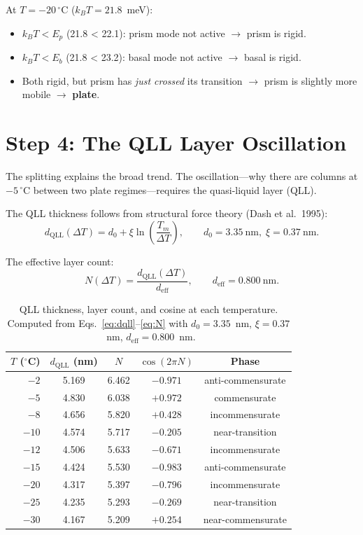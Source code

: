\documentclass[12pt,letterpaper]{article}
\begin{document}
At $T = -20\,{}^\circ$C ($k_BT = 21.8$~meV):
\begin{itemize}
\item $k_BT < E_p$ (21.8 < 22.1): prism mode not active $\to$ prism is rigid.
\item $k_BT < E_b$ (21.8 < 23.2): basal mode not active $\to$ basal is rigid.
\item Both rigid, but prism has \emph{just crossed} its transition $\to$ prism is slightly more mobile $\to$ \textbf{plate}. \checkmark
\end{itemize}

\section{Step 4: The QLL Layer Oscillation}
\label{sec:oscillation}

The splitting explains the broad trend.  The oscillation---why there are columns at $-5\,{}^\circ$C between two plate regimes---requires the quasi-liquid layer (QLL).

The QLL thickness follows from structural force theory (Dash et al.\ 1995):
\begin{equation}
d_{\mathrm{QLL}}(\Delta T) = d_0 + \xi \ln\!\left(\frac{T_m}{\Delta T}\right), \qquad d_0 = 3.35~\mathrm{nm},\; \xi = 0.37~\mathrm{nm}.
\label{eq:dqll}
\end{equation}

The effective layer count:
\begin{equation}
N(\Delta T) = \frac{d_{\mathrm{QLL}}(\Delta T)}{d_{\mathrm{eff}}}, \qquad d_{\mathrm{eff}} = 0.800~\mathrm{nm}.
\label{eq:N}
\end{equation}

\begin{table}[H]
\centering
\caption{QLL thickness, layer count, and cosine at each temperature.  Computed from Eqs.~\eqref{eq:dqll}--\eqref{eq:N} with $d_0 = 3.35$~nm, $\xi = 0.37$~nm, $d_{\mathrm{eff}} = 0.800$~nm.}
\label{tab:N}
\begin{tabular}{@{}rcccc@{}}
\toprule
$T$ (${}^\circ$C) & $d_{\mathrm{QLL}}$ (nm) & $N$ & $\cos(2\pi N)$ & Phase \\
\midrule
$-2$  & 5.169 & 6.462 & $-0.971$ & anti-commensurate \\
$-5$  & 4.830 & 6.038 & $+0.972$ & commensurate \\
$-8$  & 4.656 & 5.820 & $+0.428$ & incommensurate \\
$-10$ & 4.574 & 5.717 & $-0.205$ & near-transition \\
$-12$ & 4.506 & 5.633 & $-0.671$ & incommensurate \\
$-15$ & 4.424 & 5.530 & $-0.983$ & anti-commensurate \\
$-20$ & 4.317 & 5.397 & $-0.796$ & incommensurate \\
$-25$ & 4.235 & 5.293 & $-0.269$ & near-transition \\
$-30$ & 4.167 & 5.209 & $+0.254$ & near-commensurate \\
\bottomrule
\end{tabular}
\end{table}
\end{document}

